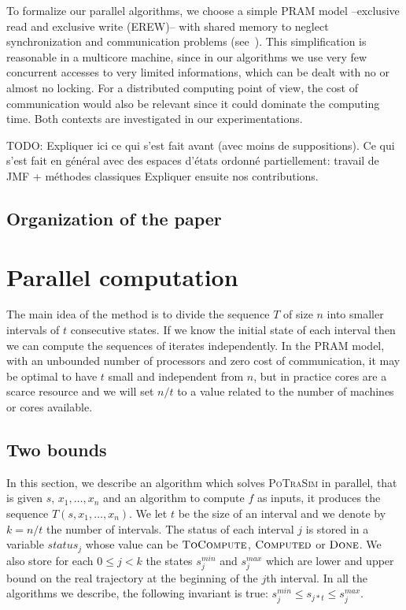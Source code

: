 \documentclass[a4paper,10pt]{article}
\newcommand{\todo}[1]{{\color{red} TODO: {#1}}}
\begin{document}
To formalize our parallel algorithms, we choose a simple PRAM model --exclusive read and exclusive write (EREW)-- with shared memory to neglect synchronization and communication problems (see~\cite{jaja1992introduction}). This simplification is reasonable in a multicore machine, since in our algorithms we use very few concurrent accesses to very limited informations, which can be dealt with no or almost no locking. For a distributed computing point of view, the cost of communication would also be relevant since it could dominate the computing time. Both contexts are investigated in our experimentations.


\todo{Expliquer ici ce qui s'est fait avant (avec moins de suppositions). Ce qui s'est fait en général avec des espaces d'états ordonné partiellement: travail de JMF + méthodes classiques
Expliquer ensuite nos contributions.}

\subsection{Organization of the paper}



\section{Parallel computation}

The main idea of the method is to divide the sequence $T$ of size $n$ into smaller intervals of $t$ consecutive states. If we know the initial state of each interval then we can compute the sequences of iterates independently. 
In the PRAM model, with an unbounded number of processors and zero cost of communication, it may be optimal to have $t$ small and independent from $n$, but in practice cores are a scarce resource and we will set $n/t$ to a value related to the number of machines or cores available.

\subsection{Two bounds}

In this section, we describe an algorithm which solves \textsc{PoTraSim} in parallel, that is given $s$, $x_1,\dots,x_n$ and an algorithm to compute $f$ as inputs, it produces the sequence  $T(s,x_1,\dots,x_n)$. We let $t$ be the size of an interval and we denote by $k = n/t$ the number of intervals. The status of each interval $j$ is stored in a variable $status_j$ whose value can be  $\textsc{ToCompute}$, $\textsc{Computed}$ or $\textsc{Done}$. We also store for each $0 \leq j < k$ the states $s_j^{min}$ and $s_j^{max}$ which are lower and upper bound on the real trajectory at the beginning of the $j$th interval. In all the algorithms we describe, the following invariant is true: $s_j^{min} \leq s_{j*t} \leq s_j^{max}$.
 
\end{document}
